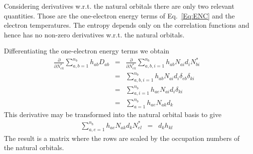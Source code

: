 \documentclass[pra]{revtex4-1}
\begin{document}
Considering derivatives w.r.t. the natural orbitals there are only two relevant
quantities. Those are the one-electron energy terms of Eq.~\ref{Eq:ENC} and the 
electron temperatures. The entropy depends only on the correlation functions
and hence has no non-zero derivatives w.r.t. the natural orbitals.

Differentiating the one-electron energy terms we obtain
\begin{eqnarray}
  \frac{\partial}{\partial N^{*}_{ek}}\sum_{a,b=1}^{n_b}h_{ab}D_{ab}
  &=& \frac{\partial}{\partial N^{*}_{ek}}
      \sum_{a,b,i=1}^{n_b}h_{ab}N_{ai}d_iN^*_{bi} \\
  &=& \sum_{a,b,i=1}^{n_b}h_{ab}N_{ai}d_i\delta_{eb}\delta_{ki} \\
  &=& \sum_{a,i=1}^{n_b}h_{ae}N_{ai}d_i\delta_{ki} \\
  &=& \sum_{a=1}^{n_b}h_{ae}N_{ak}d_k 
\end{eqnarray}
This derivative may be transformed into the natural orbital basis to give
\begin{eqnarray}
  \sum_{a,e=1}^{n_b}h_{ae}N_{ak}d_k N^*_{el}
  &=& d_k h_{kl}
\end{eqnarray}
The result is a matrix where the rows are scaled by the occupation numbers
of the natural orbitals.
\end{document}
